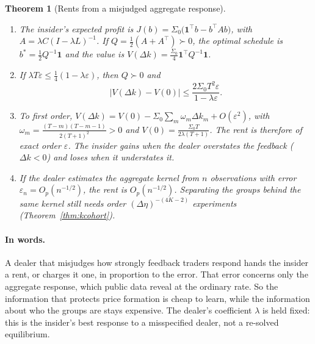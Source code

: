 \documentclass[12pt]{article}
\newtheorem{theorem}{Theorem}[section]
\theoremstyle{definition}
\theoremstyle{remark}
\begin{document}
\begin{theorem}[Rents from a misjudged aggregate response]\label{thm:rents}
\begin{enumerate}[label=(\roman*),itemsep=1pt]
\item The insider's expected profit is $J(b)=\Sigma_0\bigl(\mathbf 1^\top b-b^\top A b\bigr)$, with $A=\lambda C(I-\lambda L)^{-1}$. If $Q=\tfrac12(A+A^\top)\succ0$, the optimal schedule is $b^*=\tfrac12Q^{-1}\mathbf1$ and the value is $V(\Delta k)=\tfrac{\Sigma_0}4\mathbf1^\top Q^{-1}\mathbf1$.
\item If $\lambda T\varepsilon\le\tfrac14(1-\lambda\varepsilon)$, then $Q\succ0$ and
\[
 |V(\Delta k)-V(0)|\le\frac{2\Sigma_0T^2\varepsilon}{1-\lambda\varepsilon}.
\]
\item To first order, $V(\Delta k)=V(0)-\Sigma_0\sum_m\omega_m\Delta k_m+O(\varepsilon^2)$, with $\omega_m=\frac{(T-m)(T-m-1)}{2(T+1)^2}>0$ and $V(0)=\frac{\Sigma_0T}{2\lambda(T+1)}$. The rent is therefore of exact order $\varepsilon$. The insider gains when the dealer overstates the feedback ($\Delta k<0$) and loses when it understates it.
\item If the dealer estimates the aggregate kernel from $n$ observations with error $\varepsilon_n=O_p(n^{-1/2})$, the rent is $O_p(n^{-1/2})$. Separating the groups behind the same kernel still needs order $(\Delta\eta)^{-(4K-2)}$ experiments (Theorem~\ref{thm:kcohort}).
\end{enumerate}
\end{theorem}

\paragraph{In words.} A dealer that misjudges how strongly feedback traders respond hands the insider a rent, or charges it one, in proportion to the error. That error concerns only the aggregate response, which public data reveal at the ordinary rate. So the information that protects price formation is cheap to learn, while the information about who the groups are stays expensive. The dealer's coefficient $\lambda$ is held fixed: this is the insider's best response to a misspecified dealer, not a re-solved equilibrium.
\end{document}
